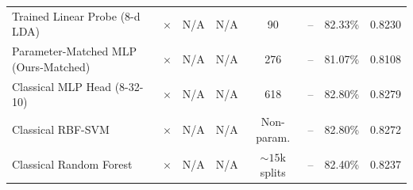 \begin{table}[t]
{\begin{tabular}{l c c c c c c c}
Trained Linear Probe (8-d LDA) & $\times$ & N/A & N/A & 90 & -- & 82.33\% & 0.8230 \\
Parameter-Matched MLP (Ours-Matched) & $\times$ & N/A & N/A & 276 & -- & 81.07\% & 0.8108 \\
Classical MLP Head (8-32-10) & $\times$ & N/A & N/A & 618 & -- & 82.80\% & 0.8279 \\
Classical RBF-SVM & $\times$ & N/A & N/A & Non-param. & -- & 82.80\% & 0.8272 \\
Classical Random Forest & $\times$ & N/A & N/A & $\sim 15$k splits & -- & 82.40\% & 0.8237 \\
\bottomrule
\end{tabular}%
}
\end{table}


